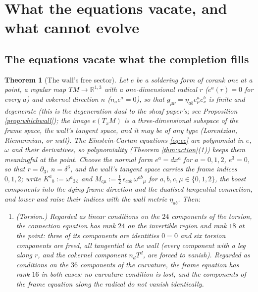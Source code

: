 \documentclass[11pt]{article}
\newtheorem{theorem}{Theorem}[section]
\theoremstyle{definition}
\begin{document}
\section{What the equations vacate, and what cannot evolve}\label{sec:vacate}

\subsection{The equations vacate what the completion fills}\label{subsec:vacate}

\begin{theorem}[The wall's free sector]\label{thm:wallfree}
Let $e$ be a soldering form of corank one at a point, a regular map $TM \to \mathbb{R}^{1,3}$ with a one-dimensional radical $r$ ($e^a(r) = 0$ for every $a$) and cokernel direction $n$ ($n_a e^a = 0$), so that $g_{\mu\nu} = \eta_{ab}e^a_\mu e^b_\nu$ is finite and degenerate (this is the degeneration dual to the sheaf paper's; see Proposition \ref{prop:whichwall}); the image $e(T_xM)$ is a three-dimensional subspace of the frame space, the wall's tangent space, and it may be of any type (Lorentzian, Riemannian, or null). The Einstein-Cartan equations \eqref{eq:ec} are polynomial in $e$, $\omega$ and their derivatives, so polynomiality (Theorem \ref{thm:action}(1)) keeps them meaningful at the point. Choose the normal form $e^a = dx^a$ for $a = 0,1,2$, $e^3 = 0$, so that $r = \partial_3$, $n = \delta^3$, and the wall's tangent space carries the frame indices $0,1,2$; write $K^{a}{}_{b} := \omega^{a}{}_{3\,b}$ and $M_{c\mu} := \tfrac12\,\epsilon_{cab}\,\omega^{ab}{}_{\mu}$ for $a, b, c, \mu \in \{0,1,2\}$, the boost components into the dying frame direction and the dualised tangential connection, and lower and raise their indices with the wall metric $\eta_{ab}$. Then:
\begin{enumerate}
\item[(a)] \emph{(Torsion.)} Regarded as linear conditions on the $24$ components of the torsion, the connection equation has rank $24$ on the invertible region and rank $18$ at the point: three of its components are identities $0 = 0$ and six torsion components are freed, all tangential to the wall (every component with a leg along $r$, and the cokernel component $n_dT^d$, are forced to vanish). Regarded as conditions on the $36$ components of the curvature, the frame equation has rank $16$ in both cases: no curvature condition is lost, and the components of the frame equation along the radical do \emph{not} vanish identically.

\end{enumerate}
\end{theorem}
\end{document}

